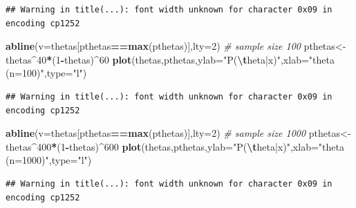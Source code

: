 \documentclass[
]{book}
\newenvironment{Shaded}{\begin{snugshade}}{\end{snugshade}}
\newcommand{\AttributeTok}[1]{\textcolor[rgb]{0.13,0.29,0.53}{#1}}
\newcommand{\CommentTok}[1]{\textcolor[rgb]{0.56,0.35,0.01}{\textit{#1}}}
\newcommand{\DecValTok}[1]{\textcolor[rgb]{0.00,0.00,0.81}{#1}}
\newcommand{\FunctionTok}[1]{\textcolor[rgb]{0.13,0.29,0.53}{\textbf{#1}}}
\newcommand{\NormalTok}[1]{#1}
\newcommand{\OtherTok}[1]{\textcolor[rgb]{0.56,0.35,0.01}{#1}}
\newcommand{\SpecialCharTok}[1]{\textcolor[rgb]{0.81,0.36,0.00}{\textbf{#1}}}
\newcommand{\StringTok}[1]{\textcolor[rgb]{0.31,0.60,0.02}{#1}}
\begin{document}
\begin{verbatim}
## Warning in title(...): font width unknown for character 0x09 in encoding cp1252
\end{verbatim}

\begin{Shaded}
\begin{Highlighting}[]
\FunctionTok{abline}\NormalTok{(}\AttributeTok{v=}\NormalTok{thetas[pthetas}\SpecialCharTok{==}\FunctionTok{max}\NormalTok{(pthetas)],}\AttributeTok{lty=}\DecValTok{2}\NormalTok{)}
\CommentTok{\# sample size 100}
\NormalTok{pthetas}\OtherTok{\textless{}{-}}\NormalTok{thetas}\SpecialCharTok{\^{}}\DecValTok{40}\SpecialCharTok{*}\NormalTok{(}\DecValTok{1}\SpecialCharTok{{-}}\NormalTok{thetas)}\SpecialCharTok{\^{}}\DecValTok{60}
\FunctionTok{plot}\NormalTok{(thetas,pthetas,}\AttributeTok{ylab=}\StringTok{"P(}\SpecialCharTok{\textbackslash{}t}\StringTok{heta|x)"}\NormalTok{,}\AttributeTok{xlab=}\StringTok{"theta  (n=100)"}\NormalTok{,}\AttributeTok{type=}\StringTok{"l"}\NormalTok{)}
\end{Highlighting}
\end{Shaded}

\begin{verbatim}
## Warning in title(...): font width unknown for character 0x09 in encoding cp1252
\end{verbatim}

\begin{Shaded}
\begin{Highlighting}[]
\FunctionTok{abline}\NormalTok{(}\AttributeTok{v=}\NormalTok{thetas[pthetas}\SpecialCharTok{==}\FunctionTok{max}\NormalTok{(pthetas)],}\AttributeTok{lty=}\DecValTok{2}\NormalTok{)}
\CommentTok{\# sample size 1000}
\NormalTok{pthetas}\OtherTok{\textless{}{-}}\NormalTok{thetas}\SpecialCharTok{\^{}}\DecValTok{400}\SpecialCharTok{*}\NormalTok{(}\DecValTok{1}\SpecialCharTok{{-}}\NormalTok{thetas)}\SpecialCharTok{\^{}}\DecValTok{600}
\FunctionTok{plot}\NormalTok{(thetas,pthetas,}\AttributeTok{ylab=}\StringTok{"P(}\SpecialCharTok{\textbackslash{}t}\StringTok{heta|x)"}\NormalTok{,}\AttributeTok{xlab=}\StringTok{"theta  (n=1000)"}\NormalTok{,}\AttributeTok{type=}\StringTok{"l"}\NormalTok{)}
\end{Highlighting}
\end{Shaded}

\begin{verbatim}
## Warning in title(...): font width unknown for character 0x09 in encoding cp1252
\end{verbatim}
\end{document}
